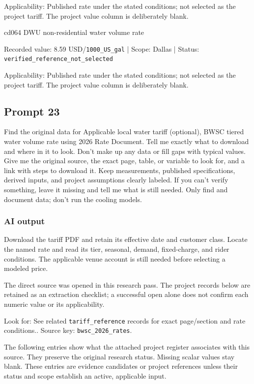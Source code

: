 Applicability: Published rate under the stated conditions; not selected as the project tariff. The project value column is deliberately blank.

cd064  DWU non-residential water volume rate

Recorded value: 8.59 USD/\nolinkurl{1000_US_gal} | Scope: Dallas | Status: \nolinkurl{verified_reference_not_selected}

Applicability: Published rate under the stated conditions; not selected as the project tariff. The project value column is deliberately blank.

\subsection*{Prompt 23}
Find the original data for Applicable local water tariff (optional), BWSC tiered water volume rate using 2026 Rate Document. Tell me exactly what to download and where in it to look. Don’t make up any data or fill gaps with typical values. Give me the original source, the exact page, table, or variable to look for, and a link with steps to download it. Keep measurements, published specifications, derived inputs, and project assumptions clearly labeled. If you can’t verify something, leave it missing and tell me what is still needed. Only find and document data; don’t run the cooling models.

\subsubsection*{AI output}
Download the tariff PDF and retain its effective date and customer class. Locate the named rate and read its tier, seasonal, demand, fixed-charge, and rider conditions. The applicable venue account is still needed before selecting a modeled price.

The direct source was opened in this research pass. The project records below are retained as an extraction checklist; a successful open alone does not confirm each numeric value or its applicability.

Look for: See related \nolinkurl{tariff_reference} records for exact page/section and rate conditions.. Source key: \nolinkurl{bwsc_2026_rates}.

The following entries show what the attached project register associates with this source. They preserve the original research status. Missing scalar values stay blank. These entries are evidence candidates or project references unless their status and scope establish an active, applicable input.


